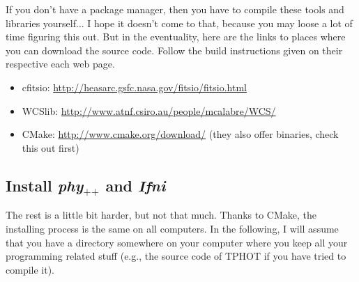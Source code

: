 \documentclass[12pt,a4paper]{article}
\newcommand{\phypp}{\textit{phy}$_{\text{++}}$\xspace}
\newcommand{\ifni}{\textit{Ifni}\xspace}
\begin{document}
If you don't have a package manager, then you have to compile these tools and libraries yourself... I hope it doesn't come to that, because you may loose a lot of time figuring this out. But in the eventuality, here are the links to places where you can download the source code. Follow the build instructions given on their respective each web page.
\begin{itemize}
\item cfitsio: \url{http://heasarc.gsfc.nasa.gov/fitsio/fitsio.html}
\item WCSlib: \url{http://www.atnf.csiro.au/people/mcalabre/WCS/}
\item CMake: \url{http://www.cmake.org/download/} (they also offer binaries, check this out first)
\end{itemize}

\subsection{Install \phypp and \ifni}

The rest is a little bit harder, but not that much. Thanks to CMake, the installing process is the same on all computers. In the following, I will assume that you have a directory somewhere on your computer where you keep all your programming related stuff (e.g., the source code of TPHOT if you have tried to compile it).
\end{document}
